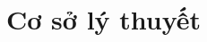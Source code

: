 \documentclass[10pt]{beamer}
\newcommand{\SubItem}[1]{
    {\setlength\itemindent{15pt} \item[-] #1}
}
\begin{document}
\section{Cơ sở lý thuyết}

\end{document}
